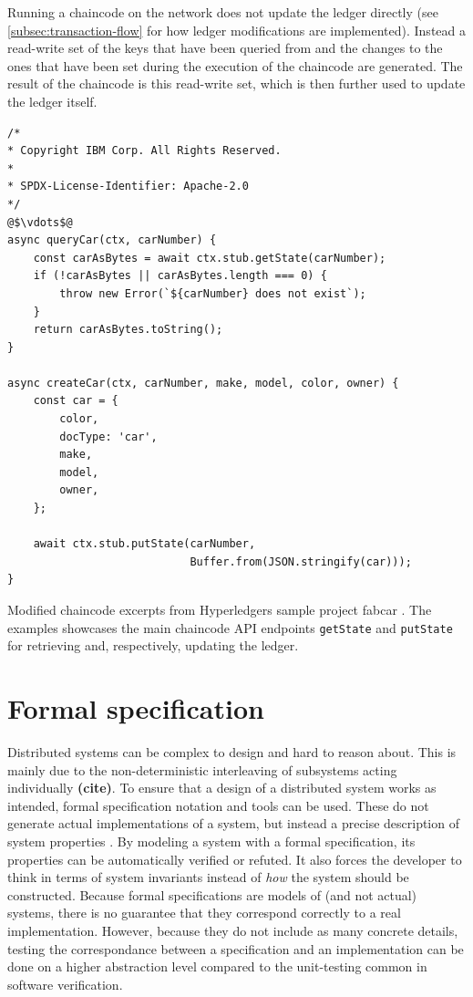 \documentclass[english, biblatex, digitaloutput]{kththesis}
\begin{document}
Running a chaincode on the network does not update the ledger directly (see \ref{subsec:transaction-flow} for how ledger modifications are implemented). Instead a read-write set of the keys that have been queried from and the changes to the ones that have been set during the execution of the chaincode are generated. The result of the chaincode is this read-write set, which is then further used to update the ledger itself.

\begin{listing}
	\begin{verbatim}
/*
* Copyright IBM Corp. All Rights Reserved.
*
* SPDX-License-Identifier: Apache-2.0
*/
@$\vdots$@
async queryCar(ctx, carNumber) {
	const carAsBytes = await ctx.stub.getState(carNumber);
	if (!carAsBytes || carAsBytes.length === 0) {
		throw new Error(`${carNumber} does not exist`);
	}
	return carAsBytes.toString();
}

async createCar(ctx, carNumber, make, model, color, owner) {
	const car = {
		color,
		docType: 'car',
		make,
		model,
		owner,
	};

	await ctx.stub.putState(carNumber, 
	                        Buffer.from(JSON.stringify(car)));
}

\end{verbatim}
	\caption{Modified chaincode excerpts from Hyperledgers sample project fabcar \cite{hyperledger_fabric-samples_2022}. The examples showcases the main chaincode API endpoints \texttt{getState} and \texttt{putState} for retrieving and, respectively, updating the ledger.}
	\label{lst:chaincode-fabcar-example}
\end{listing}



\section{Formal specification}

Distributed systems can be complex to design and hard to reason about. This is mainly due to the non-deterministic interleaving of subsystems acting individually \textbf{(cite)}. To ensure that a design of a distributed system works as intended, formal specification notation and tools can be used. These do not generate actual implementations of a system, but instead a precise description of system properties \cite{lamsweerde_formal_2000}. By modeling a system with a formal specification, its properties can be automatically verified or refuted. It also forces the developer to think in terms of system invariants instead of \textit{how} the system should be constructed. Because formal specifications are models of (and not actual) systems, there is no guarantee that they correspond correctly to a real implementation. However, because they do not include as many concrete details, testing the correspondance between a specification and an implementation can be done on a higher abstraction level compared to the unit-testing common in software verification.
\end{document}
